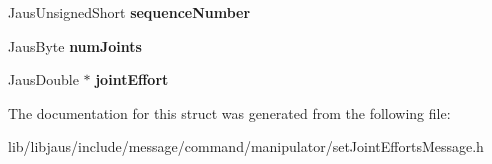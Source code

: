 \begin{DoxyCompactItemize}
\item 
\hypertarget{struct_set_joint_efforts_message_struct_a49790a054c8aafa103d3f017e308b31d}{\-Jaus\-Unsigned\-Short {\bfseries sequence\-Number}}\label{struct_set_joint_efforts_message_struct_a49790a054c8aafa103d3f017e308b31d}

\item 
\hypertarget{struct_set_joint_efforts_message_struct_ae21669ccf1b4737179223152d52fa237}{\-Jaus\-Byte {\bfseries num\-Joints}}\label{struct_set_joint_efforts_message_struct_ae21669ccf1b4737179223152d52fa237}

\item 
\hypertarget{struct_set_joint_efforts_message_struct_afc0fb6e1b0b0856e0081ea119148dc6d}{\-Jaus\-Double $\ast$ {\bfseries joint\-Effort}}\label{struct_set_joint_efforts_message_struct_afc0fb6e1b0b0856e0081ea119148dc6d}

\end{DoxyCompactItemize}


\-The documentation for this struct was generated from the following file\-:\begin{DoxyCompactItemize}
\item 
lib/libjaus/include/message/command/manipulator/set\-Joint\-Efforts\-Message.\-h\end{DoxyCompactItemize}
